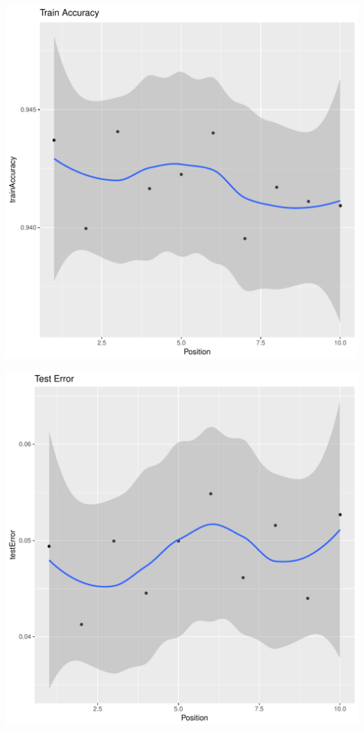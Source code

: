 \documentclass{article}\usepackage[]{graphicx}\usepackage[]{color}
\makeatletter
\def\maxwidth{ %
  \ifdim\Gin@nat@width>\linewidth
    \linewidth
  \else
    \Gin@nat@width
  \fi
}
\newenvironment{kframe}{%
 \def\at@end@of@kframe{}%
 \ifinner\ifhmode%
  \def\at@end@of@kframe{\end{minipage}}%
  \begin{minipage}{\columnwidth}%
 \fi\fi%
 \def\FrameCommand##1{\hskip\@totalleftmargin \hskip-\fboxsep
 \colorbox{shadecolor}{##1}\hskip-\fboxsep
     \hskip-\linewidth \hskip-\@totalleftmargin \hskip\columnwidth}%
 \MakeFramed {\advance\hsize-\width
   \@totalleftmargin\z@ \linewidth\hsize
   \@setminipage}}%
 {\par\unskip\endMakeFramed%
 \at@end@of@kframe}
\newenvironment{knitrout}{}{} %
\makeatother
\begin{document}
\begin{knitrout}
\begin{kframe}
{\ttfamily\noindent\itshape\color{messagecolor}{\#\# `geom\_smooth()` using method = 'loess'}}\end{kframe}
\includegraphics[width=\maxwidth]{figure/unnamed-chunk-43-4} 
\begin{kframe}

{\ttfamily\noindent\itshape\color{messagecolor}{\#\# `geom\_smooth()` using method = 'loess'}}\end{kframe}
\includegraphics[width=\maxwidth]{figure/unnamed-chunk-43-5} 
\begin{kframe}


\end{kframe}
\end{knitrout}
\end{document}
